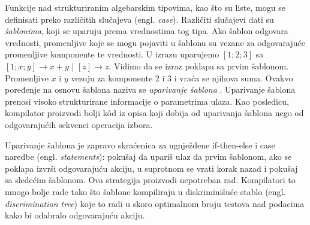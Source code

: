  
Funkcije nad strukturiranim algebarskim tipovima, kao što su liste, mogu se definisati preko različitih slučajeva (engl. \textit{case}). Različiti slučajevi dati su \textit{šablonima}, koji se uparuju prema vrednostima tog tipa. Ako šablon odgovara vrednosti, promenljive koje se mogu pojaviti u šablonu su vezane za odgovarajuće promenljive komponente te vrednosti. U izrazu uparujemo $[1; 2; 3]$  sa $[1; x; y] \longrightarrow x+y$ |  $[z] \longrightarrow z$. Vidimo da se izraz poklapa sa prvim šablonom. Promenljive $x$ i $y$ vezuju za komponente 2 i 3 i vraća se njihova suma. Ovakvo poređenje na osnovu šablona naziva se \textit{uparivanje šablona} \cite{compiler-design, compiling-fl}. Uparivanje šablona prenosi visoko strukturirane informacije o parametrima ulaza. Kao posledicu, kompilator proizvodi bolji k\^ od iz opisa koji dobija od uparivanja šablona nego od odgovarajućih sekvenci operacija izbora. %

Uparivanje šablona je zapravo skraćenica za ugnježdene if-then-else i case naredbe (engl. \textit{statements}): pokušaj da upariš ulaz da prvim šablonom, ako se poklapa izvrši odgovarajuću akciju, u suprotnom se vrati korak nazad i pokušaj sa sledećim šablonom. Ova strategija proizvodi nepotreban rad. Kompilatori to mnogo bolje rade tako što šablone kompiliraju u diskriminišuće stablo (engl. \textit{discrimination tree}) koje to radi u skoro optimalnom broju testova nad podacima kako bi odabralo odgovarajuću akciju. 
